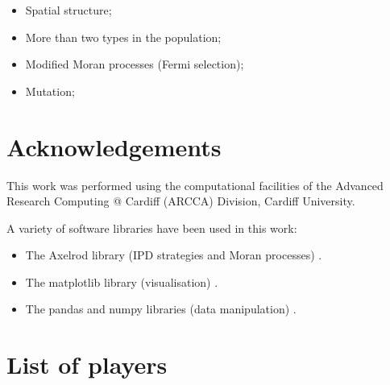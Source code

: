 \documentclass{article}
\begin{document}
\begin{itemize}
    \item Spatial structure;
    \item More than two types in the population;
    \item Modified Moran processes (Fermi selection);
    \item Mutation;
\end{itemize}

\section*{Acknowledgements}

This work was performed using the computational facilities of the Advanced
Research Computing @ Cardiff (ARCCA) Division, Cardiff University.

A variety of software libraries have been used in this work:

\begin{itemize}
    \item The Axelrod library (IPD strategies and Moran processes)
        \cite{axelrodproject}.
    \item The matplotlib library (visualisation) \cite{hunter2007matplotlib}.
    \item The pandas and numpy libraries (data manipulation)
        \cite{mckinney2010data, walt2011numpy}.
\end{itemize}

\printbibliography

\appendix

\section{List of players}\label{app:list_of_players}

\begin{multicols}{3}
	\begin{enumerate}
		
	\end{enumerate}
\end{multicols}
\end{document}
